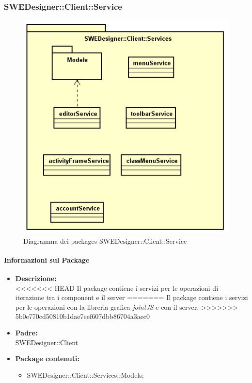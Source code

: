 \begin{itemize}
\subsubsection{SWEDesigner::Client::Service}
		 \begin{figure}[h!]
		\centering
		\includegraphics[scale=0.8]{Disegnetti/SWEDesigner__Client__Services.png}
		\caption{Diagramma dei packages SWEDesigner::Client::Service}
 		\end{figure}
		\paragraph{Informazioni sul Package}
		\begin{itemize}
			\item \textbf{Descrizione: }\\
<<<<<<< HEAD
			Il package contiene i servizi per le operazioni di iterazione tra i component e il server
=======
			Il package contiene i servizi per le operazioni con la libreria grafica
			\emph{jointJS} e con il server.
>>>>>>> 5b0e770cd50810b1dae7eef607dbb86704a3aec0
			\item \textbf{Padre: }\\ SWEDesigner::Client
			\item \textbf{Package contenuti: }
			\begin{itemize}
				\item SWEDesigner::Client::Services::Models;
			\end{itemize}
		\end{itemize}

\end{itemize}
